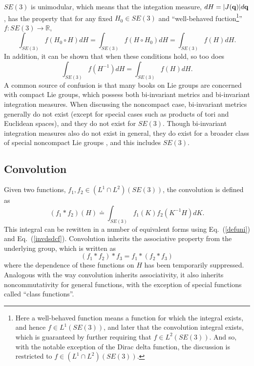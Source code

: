 \documentclass[twocolumn,10pt]{asme2ej}
\begin{document}
$SE(3)$ is unimodular, which means that the integation measure, $dH = |J({\bf q})| d{\bf q}$, has the property that for any
fixed $H_0 \in SE(3)$ and ``well-behaved fuction\footnote{Here a well-behaved function means a function for which the integral exists, and hence
$f \in L^1(SE(3))$, and later that the convolution integral exists, which is guaranteed by further requiring that
$f \in L^2(SE(3))$. And so, with the notable exception of the Dirac delta function, the discussion is restricted to
$f \in (L^1 \cap L^2)(SE(3))$.}'' $f:SE(3) \rightarrow \mathbb{R}$, \cite{myoldbook}
\begin{equation}
\int_{SE(3)} f(H_0 \circ H) dH = \int_{SE(3)} f(H \circ H_0) dH = \int_{SE(3)} f(H) dH.
\label{defuni}
\end{equation}
In addition, it can be shown that when these conditions hold, so too does
\begin{equation}
\int_{SE(3)} f(H^{-1}) dH = \int_{SE(3)} f(H) dH.
\label{invdsdcf}
\end{equation}
A common source of confusion is that many books on Lie groups are concerned with compact Lie groups, which possess both bi-invariant metrics
and bi-invariant integration measures. When discussing the noncompact case, bi-invariant metrics generally do not exist (except for special cases
such as products of tori and Euclidean spaces), and they do not exist for $SE(3)$. Though bi-invariant integration measures also do not exist in general,
they do exist for a broader class of special noncompact Lie groups%
, and this includes $SE(3)$. 

\subsection*{Convolution} \label{convsec}

Given two functions, $f_1, f_2 \in (L^1 \cap L^2)(SE(3))$, the convolution is defined as
\begin{equation}
(f_1 * f_2)(H) \doteq \int_{SE(3)} f_1(K) f_2(K^{-1} H) dK. 
\label{convdef}
\end{equation}
This integral can be rewitten in a number of equivalent forms using Eq.~(\ref{defuni}) and Eq.~(\ref{invdsdcf}).
Convolution inherits the associative property from the underlying group, which is written as 
$$ (f_1 * f_2) * f_3 = f_1 * (f_2 * f_3) $$
where the dependence of these functions on $H$ has been temporarily suppressed. Analogous with the way convolution inherits associativity, it 
also inherits noncommutativity for general functions, with the exception of special functions called ``class functions''.
\end{document}
